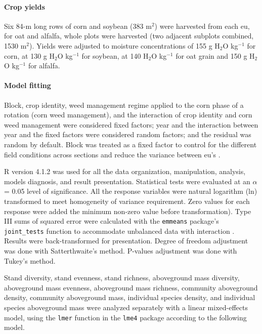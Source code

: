 \documentclass[
]{article}
\begin{document}
\hypertarget{crop-yields}{%
\paragraph*{Crop yields}\label{crop-yields}}

Six 84-m long rows of corn and soybean (383 m\(^2\)) were harvested from each eu, for oat and alfalfa, whole plots were harvested (two adjacent subplots combined, 1530 m\(^2\)). Yields were adjusted to moisture concentrations of 155 g H\(_2\)O kg\(^{-1}\) for corn, at 130 g H\(_2\)O kg\(^{-1}\) for soybean, at 140 H\(_2\)O kg\(^{-1}\) for oat grain and 150 g H\(_2\)O kg\(^{-1}\) for alfalfa.

\hypertarget{model-fitting}{%
\paragraph*{Model fitting}\label{model-fitting}}

Block, crop identity, weed management regime applied to the corn phase of a rotation (corn weed management), and the interaction of crop identity and corn weed management were considered fixed factors; year and the interaction between year and the fixed factors were considered random factors; and the residual was random by default. Block was treated as a fixed factor to control for the different field conditions across sections and reduce the variance between eu's \citep{dixonShouldBlocksBe2016}.

R version 4.1.2 \citep{rdevelopmentcoreteamLanguageEnvironmentStatistical2021} was used for all the data organization, manipulation, analysis, models diagnosis, and result presentation. Statistical tests were evaluated at an \(\alpha\) = 0.05 level of significance. All the response variables were natural logarithm (ln) transformed to meet homogeneity of variance requirement. Zero values for each response were added the minimum non-zero value before transformation). Type III sums of squared error were calculated with the \texttt{emmeans} package's \texttt{joint\_tests} function to accommodate unbalanced data with interaction \citep[version 1.7.1-1,][]{lenthEmmeansEstimatedMarginal2021}. Results were back-transformed for presentation. Degree of freedom adjustment was done with Satterthwaite's method. P-values adjustment was done with Tukey's method.

Stand diversity, stand evenness, stand richness, aboveground mass diversity, aboveground mass evenness, aboveground mass richness, community aboveground density, community aboveground mass, individual species density, and individual species aboveground mass were analyzed separately with a linear mixed-effects model, using the \texttt{lmer} function in the \texttt{lme4} package \citep[version 1.1-27.1,][]{batesLme4LinearMixedEffects2021} according to the following model.
\end{document}
